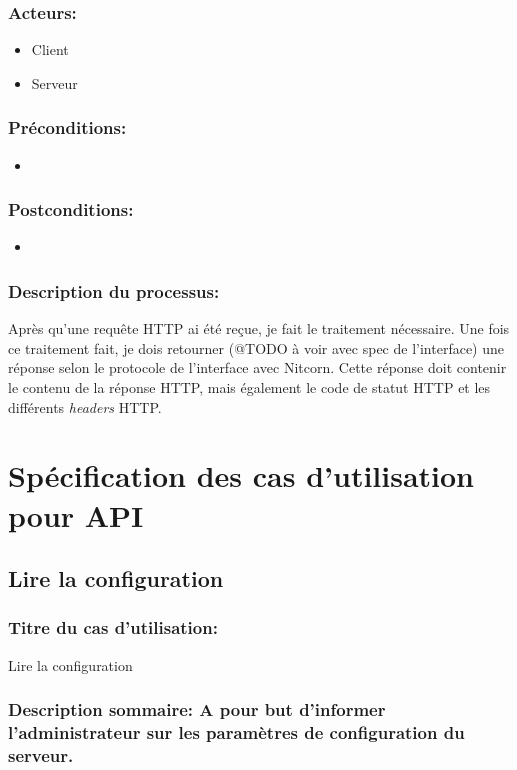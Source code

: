 \documentclass{scrreprt}
\begin{document}
\subsubsection{Acteurs:}
\begin{itemize}
    \item Client
    \item Serveur
\end{itemize}
\subsubsection{Préconditions:}
\begin{itemize}
    \item  
\end{itemize} 
\subsubsection{Postconditions:}
\begin{itemize}
    \item  
\end{itemize} 
\subsubsection{Description du processus:}Après qu'une requête HTTP ai été reçue, je fait le traitement nécessaire.
Une fois ce traitement fait, je dois retourner (@TODO à voir avec spec de l'interface)
une réponse selon le protocole de l'interface avec Nitcorn. Cette réponse doit
contenir le contenu de la réponse HTTP, mais également le code de statut HTTP
et les différents \textit{headers} HTTP.

\section{Spécification des cas d'utilisation pour API}
\subsection{Lire la configuration}
\subsubsection{Titre du cas d'utilisation:} Lire la configuration
\subsubsection{Description sommaire: A pour but d'informer l'administrateur sur les paramètres de  configuration du serveur.}
\end{document}
